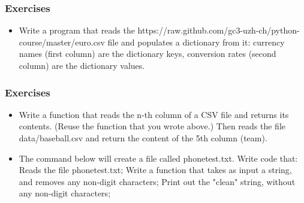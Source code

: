 %

\begin{frame}[fragile]\frametitle{Exercises}
 \begin{itemize}
    \item Write a program that reads the https://raw.github.com/gc3-uzh-ch/python-course/master/euro.csv
    file and populates a dictionary from it: currency names (first column) are the dictionary keys, conversion rates (second column) are the dictionary values.
\end{itemize}

\end{frame}

\begin{frame}[fragile]\frametitle{Exercises}
 \begin{itemize}
    \item Write a function that reads the n-th column of a CSV file and returns its contents. (Reuse the function that you wrote above.) Then reads the file data/baseball.csv and return the content of the 5th column (team).
    \item The command below will create a file called phonetest.txt. Write code that:
    Reads the file phonetest.txt;
    Write a function that takes as input a string, and removes any non-digit characters;
    Print out the "clean" string, without any non-digit characters;
\end{itemize}
\end{frame}

